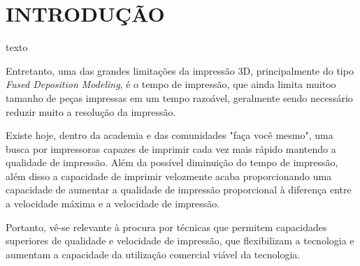 \chapter{INTRODUÇÃO}

texto

Entretanto, uma das grandes limitações da impressão 3D, principalmente
do tipo \textit{Fused Deposition Modeling}, é o tempo de impressão, que ainda 
limita muitoo tamanho de peças impressas em um tempo razoável, 
geralmente sendo necessário reduzir muito a resolução da impressão.

Existe hoje, dentro da academia e das comunidades "faça você mesmo", uma busca por 
impressoras capazes de imprimir cada vez mais rápido mantendo a qualidade 
de impressão. Além  da possível diminuição do tempo de impressão, 
além disso a capacidade de imprimir velozmente acaba proporcionando 
uma capacidade de aumentar a qualidade de impressão proporcional à diferença
entre a velocidade máxima e a velocidade de impressão.

Portanto, vê-se  relevante à procura por técnicas que permitem capacidades 
superiores de qualidade e velocidade de impressão, que flexibilizam a 
tecnologia e aumentam a capacidade da utilização comercial viável da tecnologia.
